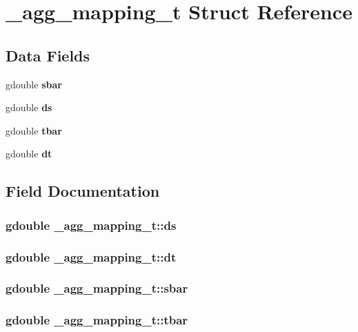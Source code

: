 \section{\+\_\+agg\+\_\+mapping\+\_\+t Struct Reference}
\label{struct__agg__mapping__t}
\subsection*{Data Fields}
\begin{DoxyCompactItemize}
\item 
gdouble {\bf sbar}
\item 
gdouble {\bf ds}
\item 
gdouble {\bf tbar}
\item 
gdouble {\bf dt}
\end{DoxyCompactItemize}


\subsection{Field Documentation}
\subsubsection[{ds}]{\setlength{\rightskip}{0pt plus 5cm}gdouble \+\_\+agg\+\_\+mapping\+\_\+t\+::ds}\label{struct__agg__mapping__t_adfa59d9efa5ccaed08f315d24d9ecbb3}
\subsubsection[{dt}]{\setlength{\rightskip}{0pt plus 5cm}gdouble \+\_\+agg\+\_\+mapping\+\_\+t\+::dt}\label{struct__agg__mapping__t_aef377f2240c25e32d145bfd79c65d01d}
\subsubsection[{sbar}]{\setlength{\rightskip}{0pt plus 5cm}gdouble \+\_\+agg\+\_\+mapping\+\_\+t\+::sbar}\label{struct__agg__mapping__t_a3ba7778aff5e6ae050c604820640bcb1}
\subsubsection[{tbar}]{\setlength{\rightskip}{0pt plus 5cm}gdouble \+\_\+agg\+\_\+mapping\+\_\+t\+::tbar}\label{struct__agg__mapping__t_aa13108e7ad08ba96944ebb0793d0420c}
